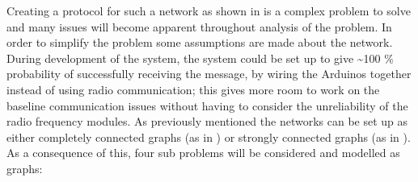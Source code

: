 \noindent Creating a protocol for such a network as shown in  is a complex problem to solve and many issues will become apparent throughout analysis of the problem.
In order to simplify the problem some assumptions are made about the network.
During development of the system, the system could be set up to give \textasciitilde100 \% probability of successfully receiving the message, by wiring the Arduinos together instead of using radio communication; this gives more room to work on the baseline communication issues without having to consider the unreliability of the radio frequency modules.
As previously mentioned the networks can be set up as either completely connected graphs (as in ) or strongly connected graphs (as in ).
As a consequence of this, four sub problems will be considered and modelled as graphs:

